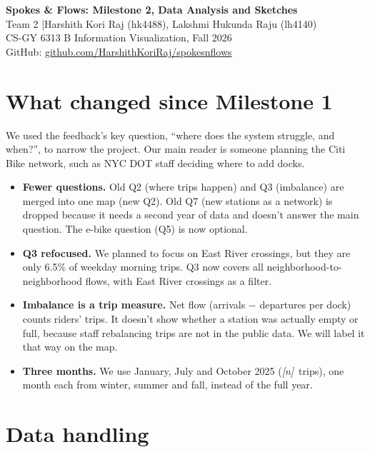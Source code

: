 \documentclass[11pt]{article}
\newcommand{\TripsRaw}{\textit{[n]}}
\begin{document}
\begin{center}
  {\Large\bfseries Spokes \& Flows: Milestone 2, Data Analysis and Sketches}\\[3pt]
  Team 2 \quad|\quad Harshith Kori Raj (hk4488), Lakshmi Hukunda Raju (lh4140)\\
  CS-GY 6313 B Information Visualization, Fall 2026\\[2pt]
  GitHub: \href{https://github.com/HarshithKoriRaj/spokesnflows}{github.com/HarshithKoriRaj/spokesnflows}
\end{center}

\section{What changed since Milestone 1}

We used the feedback's key question, ``where does the system struggle, and when?'', to narrow the project. Our main
reader is someone planning the Citi Bike network, such as NYC DOT staff deciding where to add docks.

\begin{itemize}
  \item \textbf{Fewer questions.} Old Q2 (where trips happen) and Q3 (imbalance) are merged into one map (new Q2).
        Old Q7 (new stations as a network) is dropped because it needs a second year of data and doesn't answer the
        main question. The e-bike question (Q5) is now optional.
  \item \textbf{Q3 refocused.} We planned to focus on East River crossings, but they are only 6.5\% of weekday
        morning trips. Q3 now covers all neighborhood-to-neighborhood flows, with East River crossings as a filter.
  \item \textbf{Imbalance is a trip measure.} Net flow (arrivals $-$ departures per dock) counts riders' trips. It
        doesn't show whether a station was actually empty or full, because staff rebalancing trips are not in the
        public data. We will label it that way on the map.
  \item \textbf{Three months.} We use January, July and October 2025 (\TripsRaw\ trips), one month each from
        winter, summer and fall, instead of the full year.
\end{itemize}

\section{Data handling}
\end{document}
